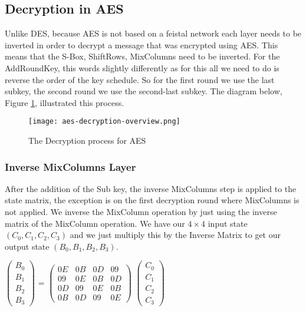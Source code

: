 \subsection{Decryption in AES}

Unlike DES, because AES is not based on a feistal network each layer needs to be inverted in order to decrypt a message that was encrypted using AES. This means that the S-Box, ShiftRows, MixColumns need to be inverted. For the AddRoundKey, this words slightly differently as for this all we need to do is reverse the order of the key schedule. So for the first round we use the last subkey, the second round we use the second-last subkey. The diagram below, Figure \ref{AES-Dec-Overview}, illustrated this process.

\begin{figure}[h!]
\begin{center}
\texttt{[image: aes-decryption-overview.png]}
\end{center}
\caption{The Decryption process for AES}
\label{AES-Dec-Overview}
\end{figure}

\subsubsection{Inverse MixColumns Layer}

After the addition of the Sub key, the inverse MixColumns step is applied to the state matrix, the exception is on the first decryption round where MixColumns is not applied. We inverse the MixColumn operation by just using the inverse matrix of the MixColumn operation. We have our $4\times4$ input state $(C_0, C_1, C_2, C_3)$ and we just multiply this by the Inverse Matrix to get our output state $(B_0, B_1, B_2, B_3)$.

\begin{center}
$
\begin{pmatrix}
B_0 \\
B_1 \\
B_2 \\
B_3
\end{pmatrix} 
$
=
$
\begin{pmatrix}
0E & 0B & 0D & 09 \\
09 & 0E & 0B & 0D \\
0D & 09 & 0E & 0B \\
0B & 0D & 09 & 0E
\end{pmatrix}
$
$
\begin{pmatrix}
C_0 \\
C_1 \\
C_2 \\
C_3 
\end{pmatrix}
$
\end{center}

